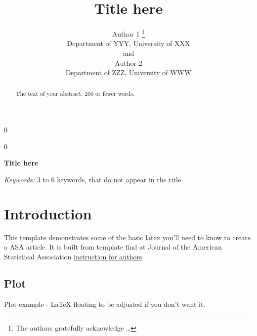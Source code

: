 \documentclass[12pt]{article}
\newcommand{\blind}{0}
\begin{document}
\def\spacingset#1{\renewcommand{\baselinestretch}%
{#1}\small\normalsize} \spacingset{1}



\blind
{
  \title{\bf Title here}

  \author{
        Author 1 \thanks{The authors gratefully acknowledge \ldots{}} \\
    Department of YYY, University of XXX\\
     and \\     Author 2 \\
    Department of ZZZ, University of WWW\\
      }
  \maketitle
} \fi

\blind
{
  \bigskip
  \bigskip
  \bigskip
  \begin{center}
    {\LARGE\bf Title here}
  \end{center}
  \medskip
} \fi

\bigskip
\begin{abstract}
The text of your abstract. 200 or fewer words.
\end{abstract}

\noindent%
{\it Keywords:} 3 to 6 keywords, that do not appear in the title

\vfill

\newpage
\spacingset{1.9} %

\section{Introduction}\label{introduction}

This template demonstrates some of the basic latex you'll need to know
to create a ASA article. It is built from template find at Journal of
the American Statistical Association
\href{https://www.tandfonline.com/action/authorSubmission?show=instructions&journalCode=uasa20\#formatting}{instruction
for authors}

\subsection{Plot}\label{plot}

Plot example - LaTeX floating to be adjusted if you don't want it.
\end{document}
